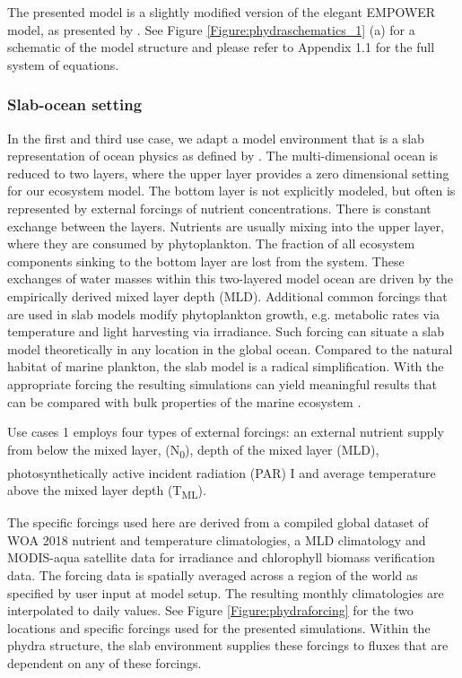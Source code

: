 \documentclass[journal abbreviations, manuscript]{copernicus}
\begin{document}
The presented model is a slightly modified version of the elegant EMPOWER model, as presented by \citet{Anderson2015c}. 
See Figure \ref{Figure:phydraschematics_1} (a) for a schematic of the model structure and please refer to Appendix 1.1 for the full system of equations.


\subsubsection{Slab-ocean setting} \label{Section:SlabOcean}

In the first and third use case, we adapt a model environment that is a slab representation of ocean physics as defined by \citet{Evans1985ACycles}. The multi-dimensional ocean is reduced to two layers, where the upper layer provides a zero dimensional setting for our ecosystem model. The bottom layer is not explicitly modeled, but often is represented by external forcings of nutrient concentrations. There is constant exchange between the layers. Nutrients are usually mixing into the upper layer, where they are consumed by phytoplankton. The fraction of all ecosystem components sinking to the bottom layer are lost from the system. These exchanges of water masses within this two-layered model ocean are driven by the empirically derived mixed layer depth (MLD). Additional common forcings that are used in slab models modify phytoplankton growth, e.g. metabolic rates via temperature and light harvesting via irradiance. Such forcing can situate a slab model theoretically in any location in the global ocean. Compared to the natural habitat of marine plankton, the slab model is a radical simplification. With the appropriate forcing the resulting simulations can yield meaningful results that can be compared with bulk properties of the marine ecosystem \cite[e.g.][]{Evans1985ACycles, Fasham1990a}.

Use cases 1 employs four types of external forcings: an external nutrient supply from below the mixed layer, (\unit{N_0}), depth of the mixed layer (MLD), photosynthetically active incident radiation (PAR) \unit{I^\emptyset} and average temperature above the mixed layer depth (\unit{T_{ML}}).

The specific forcings used here are derived from a compiled global dataset of WOA 2018 nutrient and temperature climatologies, a MLD climatology and MODIS-aqua satellite data for irradiance and chlorophyll biomass verification data. The forcing data is spatially averaged across a region of the world as specified by user input at model setup. The resulting monthly climatologies are interpolated to daily values. See Figure \ref{Figure:phydraforcing} for the two locations and specific forcings used for the presented simulations. Within the phydra structure, the slab environment supplies these forcings to fluxes that are dependent on any of these forcings. 
\end{document}

